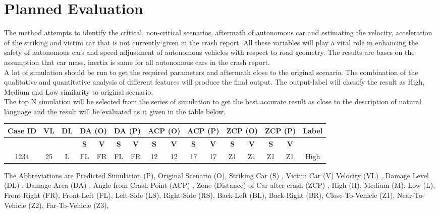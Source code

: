 \section{Planned Evaluation}

The method attempts to identify the critical, non-critical scenarios, aftermath of autonomous car and estimating the velocity, acceleration of the striking and victim car that is not currently given in the crash report. All these variables will play a vital role in enhancing the safety of autonomous cars and speed adjustment of autonomous vehicles with respect to road geometry. The results are bases on the assumption that car mass, inertia is same for all autonomous cars in the crash report. \\ 
 
A lot of simulation should be run to get the required parameters and aftermath close to the original scenario. The combination of the qualitative and quantitative analysis of different features will produce the final output. The output-label will classify the result as High, Medium and Low similarity to original scenario.\\

The top N simulation will be selected from the series of simulation to get the best accurate result as close to the description of natural language and the result will be evaluated as it given in the table below. \\

\begin{table}[h!]
\centering
\begin{tabular}{| *{16}{c|} }

    \hline
Case ID & VL & DL  
& \multicolumn{2}{c|}{DA (O)}
& \multicolumn{2}{c|}{DA (P)}
            & \multicolumn{2}{c|}{ACP (O)}
            & \multicolumn{2}{c|}{ACP (P)}
                    & \multicolumn{2}{c|}{ZCP (O)}
                    & \multicolumn{2}{c|}{ZCP (P)}
                            & \multicolumn{1}{c|}{Label}                \\
    \hline
  & &   &   \textbf{S}  &   \textbf{V} &   \textbf{S}  &   \textbf{V} &   \textbf{S}  &   \textbf{V} &   \textbf{S}  &   \textbf{V}  &   \textbf{S}  &   \textbf{V}  &   \textbf{S}  &   \textbf{V}  &    \\
    \hline
1234   & 25 &   L  &   FL  &   FR &   FL  &   FR  &   12  &   12 &   17  &   17  &   Z1  &   Z1 &   Z1  &   Z1 &   High  \\
    \hline
\end{tabular}
\end{table}


The Abbreviations are Predicted Simulation (P),  
 Original Scenario  (O), 
 Striking Car  (S) , 
 Victim Car (V) 
 Velocity  (VL) , 
 Damage Level (DL) ,  
 Damage Area (DA) ,    
 Angle from Crash Point (ACP) , 
 Zone (Distance) of Car after crash (ZCP) , 
 High (H), 
 Medium (M),  
 Low (L), 
 Front-Right (FR), 
 Front-Left (FL),  
 Left-Side (LS), 
 Right-Side (RS), 
 Back-Left (BL),  
 Back-Right (BR), 
 Close-To-Vehicle (Z1), 
 Near-To-Vehicle (Z2),  
 Far-To-Vehicle (Z3), \\